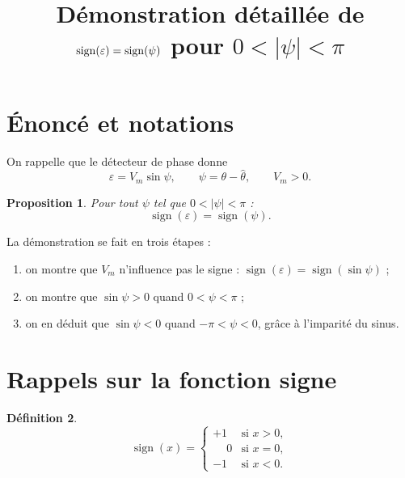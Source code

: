 \documentclass[11pt,a4paper]{article}
\title{\textbf{Démonstration détaillée de}\\[4pt]
$\sign(\varepsilon)=\sign(\psi)$ \textbf{pour} $0<|\psi|<\pi$}
\date{}
\numberwithin{equation}{section}
\theoremstyle{plain}
\newtheorem{proposition}{Proposition}[section]
\theoremstyle{definition}
\newtheorem{definition}[proposition]{Définition}
\newcommand{\sign}{\operatorname{sign}}
\newcommand{\hth}{\hat{\theta}}
\begin{document}
\maketitle

\section{Énoncé et notations}

On rappelle que le détecteur de phase donne
\begin{equation}\label{eq:eps}
\varepsilon = V_m\sin\psi,\qquad \psi = \theta-\hth,\qquad V_m>0 .
\end{equation}

\begin{proposition}\label{prop:main}
Pour tout $\psi$ tel que $0<|\psi|<\pi$ :
\begin{equation}
\sign(\varepsilon) = \sign(\psi).
\end{equation}
\end{proposition}

\begin{idee}
La démonstration se fait en trois étapes :
\begin{enumerate}
  \item on montre que $V_m$ n'influence pas le signe : $\sign(\varepsilon)=\sign(\sin\psi)$ ;
  \item on montre que $\sin\psi>0$ quand $0<\psi<\pi$ ;
  \item on en déduit que $\sin\psi<0$ quand $-\pi<\psi<0$, grâce à l'imparité du sinus.
\end{enumerate}
\end{idee}

\section{Rappels sur la fonction signe}

\begin{definition}
\begin{equation}
\sign(x) = \begin{cases} +1 & \text{si } x>0,\\ \phantom{+}0 & \text{si } x=0,\\ -1 & \text{si } x<0. \end{cases}
\end{equation}
\end{definition}
\end{document}
